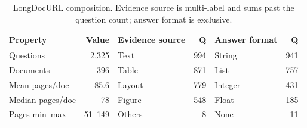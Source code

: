 \begin{table}[h]
\centering
\small
\begin{tabular}{lr@{\hskip 2em}lr@{\hskip 2em}lr}
\toprule
Property & Value & Evidence source & Q & Answer format & Q \\
\midrule
Questions        & 2,325   & Text   & 994 & String  & 941 \\
Documents        & 396     & Table  & 871 & List    & 757 \\
Mean pages/doc   & 85.6    & Layout & 779 & Integer & 431 \\
Median pages/doc & 78      & Figure & 548 & Float   & 185 \\
Pages min--max   & 51--149 & Others & 8   & None    & 11 \\
\bottomrule
\end{tabular}
\caption{LongDocURL composition. Evidence source is multi-label and sums past the question count; answer format is exclusive.}
\label{tab:ldu_composition}
\end{table}
